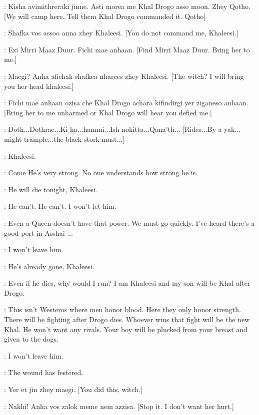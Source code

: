 \DAENERYS: Kisha avimithreraki jinne. Asti morea me Khal Drogo asso moon. Zhey Qotho. [We will camp here. Tell them Khal Drogo commanded it. Qotho] 

\QOTHO: Shafka vos assoo anna zhey Khaleesi. [You do not command me, Khaleesi.] 

\DAENERYS: Ezi Mirri Maaz Duur. Fichi mae anhaan. [Find Mirri Maaz Duur. Bring her to me.] 

\QOTHO: Maegi? Anha afichak shafkea nharees zhey Khaleesi. [The witch? I will bring you her head khaleesi.] 

\DAENERYS: Fichi mae anhaan ozisa che Khal Drogo achara kifindirgi yer ziganeso anhaan. [Bring her to me unharmed or Khal Drogo will hear you defied me.] 


\DROGO: Doth$\ldots$Dothrae$\ldots$Ki ha$\ldots$hammi$\ldots$Ish nokitta$\ldots$Qana'th$\ldots$ [Rides$\ldots$By a yak$\ldots$might trample$\ldots$the black stork must$\ldots$] 

\JORAH: Khaleesi.  

\DAENERYS: Come  He's very strong. No one understands how strong he is. 

\JORAH: He will die tonight, Khaleesi. 

\DAENERYS: He can't. He can't. I won't let him. 

\JORAH: Even a Queen doesn't have that power. We must go quickly. I've heard there's a good port in Asshai $\ldots$  

\DAENERYS: I won't leave him. 

\JORAH: He's already gone, Khaleesi. 

\DAENERYS: Even if he dies, why would I run? I am Khaleesi and my  son will be Khal after Drogo. 

\JORAH: This isn't Westeros where men honor blood. Here they only honor strength. There will be fighting after Drogo dies. Whoever wins that fight will be the new Khal. He won't want any rivals. Your boy will be plucked from your breast and given to the dogs. 

\DAENERYS: I won't leave him. 


\MIRRI: The wound has festered. 

\QOTHO: Yer et jin zhey maegi. [You did this, witch.] 

\DAENERYS: Nakhi! Anha vos zalok meme nem azzisa. [Stop it. I don't want her hurt.] 

